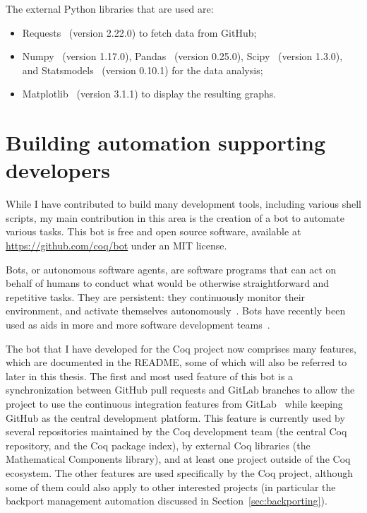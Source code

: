 The external Python libraries that are used are:
\begin{itemize}
	\item Requests~\cite{reitz2018requests} (version 2.22.0) to fetch data from GitHub;
	\item Numpy~\cite{numpy} (version 1.17.0), Pandas~\cite{mckinney-proc-scipy-2010} (version 0.25.0), Scipy~\cite{Scipy} (version 1.3.0), and Statsmodels~\cite{statsmodel} (version 0.10.1) for the data analysis;
	\item Matplotlib~\cite{Matplotlib} (version 3.1.1) to display the resulting graphs.
\end{itemize}

\section{Building automation supporting developers}

\label{sec:bot}

While I have contributed to build many development tools, including various shell scripts, my main contribution in this area is the creation of a bot to automate various tasks.
This bot is free and open source software, available at \url{https://github.com/coq/bot} under an MIT license.

Bots, or autonomous software agents, are software programs that can act on behalf of humans to conduct what would be otherwise straightforward and repetitive tasks.
They are persistent: they continuously monitor their environment, and activate themselves autonomously~\cite{franklin1996agent}.
Bots have recently been used as aids in more and more software development teams~\cite{storey2016disrupting}.

The bot that I have developed for the Coq project now comprises many features, which are documented in the README, some of which will also be referred to later in this thesis.
The first and most used feature of this bot is a synchronization between GitHub pull requests and GitLab branches to allow the project to use the continuous integration features from GitLab~\cite{gitlab} while keeping GitHub as the central development platform. This feature is currently used by several repositories maintained by the Coq development team (the central Coq repository, and  the Coq package index), by external Coq libraries (the Mathematical Components library), and at least one project outside of the Coq ecosystem.
The other features are used specifically by the Coq project, although some of them could also apply to other interested projects (in particular the backport management automation discussed in Section~\ref{sec:backporting}).

